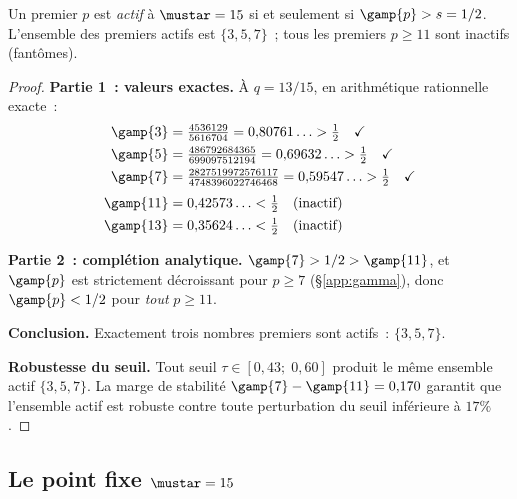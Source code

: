 \documentclass[12pt,a4paper]{article}
\begin{document}
\begin{theorembox}
Un premier $p$ est \emph{actif} \`a $\mustar = 15$ si et seulement si
$\gamp{p} > s = 1/2$. L'ensemble des premiers actifs est
$\{3, 5, 7\}$~; tous les premiers $p \geq 11$ sont inactifs (fant\^omes).

\begin{proof}
\textbf{Partie 1~: valeurs exactes.}
\`A $q = 13/15$, en arithm\'etique rationnelle exacte~:
\begin{align*}
\gamp{3} &= \tfrac{4536129}{5616704} = 0{,}80761\ldots > \tfrac{1}{2} \quad \checkmark \\
\gamp{5} &= \tfrac{486792684365}{699097512194} = 0{,}69632\ldots > \tfrac{1}{2} \quad \checkmark \\
\gamp{7} &= \tfrac{2827519972576117}{4748396022746468} = 0{,}59547\ldots > \tfrac{1}{2} \quad \checkmark \\[3pt]
\gamp{11} &= 0{,}42573\ldots < \tfrac{1}{2} \quad \text{(inactif)} \\
\gamp{13} &= 0{,}35624\ldots < \tfrac{1}{2} \quad \text{(inactif)}
\end{align*}

\textbf{Partie 2~: compl\'etion analytique.}
$\gamp{7} > 1/2 > \gamp{11}$, et $\gamp{p}$ est strictement
d\'ecroissant pour $p \geq 7$ (\S\ref{app:gamma}), donc
$\gamp{p} < 1/2$ pour \emph{tout} $p \geq 11$.

\textbf{Conclusion.}
Exactement trois nombres premiers sont actifs~: $\{3, 5, 7\}$.

\medskip\noindent
\textbf{Robustesse du seuil.}
Tout seuil $\tau \in [0{,}43;\; 0{,}60]$ produit le m\^eme ensemble
actif $\{3, 5, 7\}$. La marge de stabilit\'e
$\gamp{7} - \gamp{11} = 0{,}170$ garantit que l'ensemble actif est
robuste contre toute perturbation du seuil inf\'erieure \`a $17\%$.
\end{proof}
\end{theorembox}

\subsection{Le point fixe $\mustar = 15$}
\label{app:fixed_point}
\end{document}
